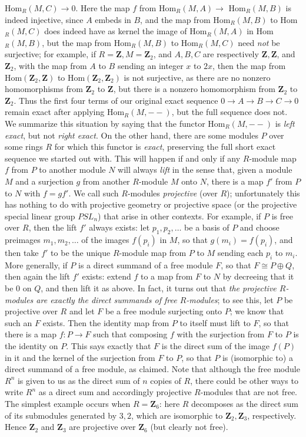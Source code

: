 \documentclass[10pt]{article}
\begin{document}
Hom$_R(M,C)\rightarrow0$. Here the map $f$ from
Hom$_R(M,A)\rightarrow\,\,$Hom$_R(M,B)$ is indeed injective, since $A$
embeds in $B$, and the map from Hom$_R(M,B)$ to Hom$_R(M,C)$ does indeed
have as kernel the image of Hom$_R(M,A)$ in Hom$_R(M,B)$, but the map
from Hom$_R(M,B)$ to Hom$_R(M,C)$ need {\sl not} be surjective; for
example, if $R=\mathbf{Z}, M = \mathbf{Z}_2$, and $A,B,C$ are
respectively $\mathbf{Z}, \mathbf{Z}$, and $\mathbf{Z}_2$, with the map
from $A$ to $B$ sending an integer $x$ to $2x$, then the map from
Hom$(\mathbf{Z}_2,\mathbf{Z})$ to Hom$(\mathbf{Z}_2, \mathbf{Z}_2)$ is
not surjective, as there are no nonzero homomorphisms from
$\mathbf{Z}_2$ to $\mathbf{Z}$, but there is a nonzero homomorphism from
$\mathbf{Z}_2$ to $\mathbf{Z}_2$. Thus the first four terms of our
original exact sequence $0\rightarrow A\rightarrow B\rightarrow
C\rightarrow 0$ remain exact after applying Hom$_R(M,--)$, but the full
sequence does not. We summarize this situation by saying that the
functor Hom$_R(M,--)$ is {\sl left exact}, but not {\sl right exact}. On
the other hand, there are some modules $P$ over some rings $R$ for which
this functor is {\sl exact}, preserving the full short exact sequence we
started out with. This will happen if and only if any $R$-module map $f$
from $P$ to another module $N$ will always {\sl lift} in the sense that,
given a module $M$ and a surjection $g$ from another $R$-module $M$ onto
$N$, there is a map $f'$ from $P$ to $N$ with $f= gf'$. We call such
$R$-modules {\sl projective} (over $R$); unfortunately this has nothing
to do with projective geometry or projective space (or the projective
special linear group $PSL_n$) that arise in other contexts. For example,
if $P$ is free over $R$, then the lift $f'$ always exists: let
$p_1,p_2,\ldots$ be a basis of $P$ and choose preimages $m_1,m_2,\ldots$
of the images $f(p_i)$ in $M$, so that $g(m_i) = f(p_i)$, and then take
$f'$ to be the unique $R$-module map from $P$ to $M$ sending each $p_i$
to $m_i$. More generally, if $P$ is a direct summand of a free module
$F$, so that $F\cong P\oplus Q$, then again the lift $f'$ exists: extend
$f$ to a map from $F$ to $N$ by decreeing that it be 0 on $Q$, and then
lift it as above. In fact, it turns out that {\sl the projective
  $R$-modules are exactly the direct summands of free $R$-modules}; to
see this, let $P$ be projective over $R$ and let $F$ be a free module
surjecting onto $P$; we know that such an $F$ exists. Then the identity
map from $P$ to itself must lift to $F$, so that there is a map
$f:P\rightarrow F$ such that composing $f$ with the surjection from $F$
to $P$ is the identity on $P$. This says exactly that $F$ is the direct
sum of the image $f(P)$ in it and the kernel of the surjection from $F$
to $P$, so that $P$ is (isomorphic to) a direct summand of a free
module, as claimed. Note that although the free module $R^n$ is given to
us as the direct sum of $n$ copies of $R$, there could be other ways to
write $R^n$ as a direct sum and accordingly projective $R$-modules that
are not free. The simplest example occurs when $R = \mathbf{Z}_6$: here
$R$ decomposes as the direct sum of its submodules generated by $3,2$,
which are isomorphic to $\mathbf{Z}_2,\mathbf{Z}_3$, respectively. Hence
$\mathbf{Z}_2$ and $\mathbf{Z}_3$ are projective over $\mathbf{Z}_6$
(but clearly not free).
\end{document}

